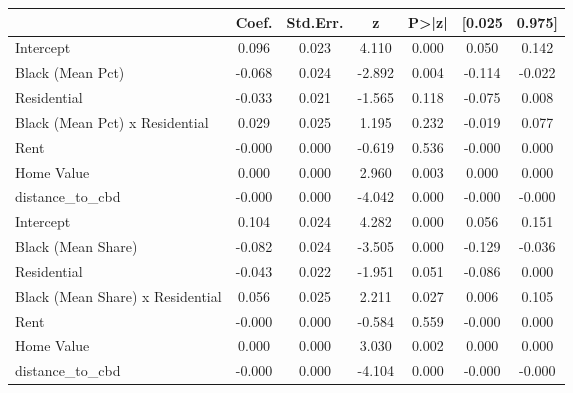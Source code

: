 \begin{tabular}{lcccccc}
\toprule
 & Coef. & Std.Err. & z & P>|z| & [0.025 & 0.975] \\
\midrule
Intercept & 0.096 & 0.023 & 4.110 & 0.000 & 0.050 & 0.142 \\
Black (Mean Pct) & -0.068 & 0.024 & -2.892 & 0.004 & -0.114 & -0.022 \\
Residential & -0.033 & 0.021 & -1.565 & 0.118 & -0.075 & 0.008 \\
Black (Mean Pct) x Residential & 0.029 & 0.025 & 1.195 & 0.232 & -0.019 & 0.077 \\
Rent & -0.000 & 0.000 & -0.619 & 0.536 & -0.000 & 0.000 \\
Home Value & 0.000 & 0.000 & 2.960 & 0.003 & 0.000 & 0.000 \\
distance_to_cbd & -0.000 & 0.000 & -4.042 & 0.000 & -0.000 & -0.000 \\
Intercept & 0.104 & 0.024 & 4.282 & 0.000 & 0.056 & 0.151 \\
Black (Mean Share) & -0.082 & 0.024 & -3.505 & 0.000 & -0.129 & -0.036 \\
Residential & -0.043 & 0.022 & -1.951 & 0.051 & -0.086 & 0.000 \\
Black (Mean Share) x Residential & 0.056 & 0.025 & 2.211 & 0.027 & 0.006 & 0.105 \\
Rent & -0.000 & 0.000 & -0.584 & 0.559 & -0.000 & 0.000 \\
Home Value & 0.000 & 0.000 & 3.030 & 0.002 & 0.000 & 0.000 \\
distance_to_cbd & -0.000 & 0.000 & -4.104 & 0.000 & -0.000 & -0.000 \\
\bottomrule
\end{tabular}
